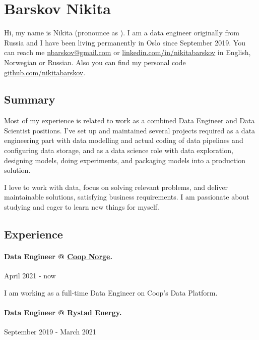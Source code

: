 \documentclass[11pt]{article}
\begin{document}
\section*{Barskov Nikita}

Hi, my name is Nikita (pronounce as ). I am a data engineer originally from Russia and
I have been living permanently in Oslo since September 2019.
You can reach me \faEnvelope \href{mailto:nbarskov@gmail.com}{nbarskov@gmail.com}
or \faLinkedin \href{https://linkedin.com/in/nikitabarskov}{linkedin.com/in/nikitabarskov}
in English, Norwegian or Russian. Also you can find my personal code
\faGithub \href{https://github.com/nikitabarskov}{github.com/nikitabarskov}.

\subsection*{Summary}

Most of my experience is related to work as a combined Data Engineer
and Data Scientist positions. I've set up and maintained several projects
required as a data engineering part with data modelling and actual coding of
data pipelines and configuring data storage, and as a data science
role with data exploration, designing models, doing experiments,
and packaging models into a production solution.

I love to work with data, focus on solving relevant problems,
and deliver maintainable solutions, satisfying business requirements.
I am passionate about studying and eager to learn new things for myself.

\subsection*{Experience}

\paragraph*{Data Engineer @ \href{https://coop.no}{Coop Norge}.} April 2021 - now

I am working as a full-time Data Engineer on Coop's Data Platform.

\paragraph*{Data Engineer @ \href{https://www.rystadenergy.com}{Rystad Energy}.} September 2019 - March 2021
\end{document}
